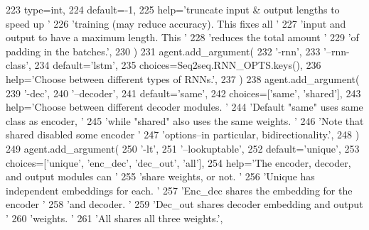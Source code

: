 \begin{DoxyCode}
223             type=int,
224             default=-1,
225             help=\textcolor{stringliteral}{'truncate input & output lengths to speed up '}
226             \textcolor{stringliteral}{'training (may reduce accuracy). This fixes all '}
227             \textcolor{stringliteral}{'input and output to have a maximum length. This '}
228             \textcolor{stringliteral}{'reduces the total amount '}
229             \textcolor{stringliteral}{'of padding in the batches.'},
230         )
231         agent.add\_argument(
232             \textcolor{stringliteral}{'-rnn'},
233             \textcolor{stringliteral}{'--rnn-class'},
234             default=\textcolor{stringliteral}{'lstm'},
235             choices=Seq2seq.RNN\_OPTS.keys(),
236             help=\textcolor{stringliteral}{'Choose between different types of RNNs.'},
237         )
238         agent.add\_argument(
239             \textcolor{stringliteral}{'-dec'},
240             \textcolor{stringliteral}{'--decoder'},
241             default=\textcolor{stringliteral}{'same'},
242             choices=[\textcolor{stringliteral}{'same'}, \textcolor{stringliteral}{'shared'}],
243             help=\textcolor{stringliteral}{'Choose between different decoder modules. '}
244             \textcolor{stringliteral}{'Default "same" uses same class as encoder, '}
245             \textcolor{stringliteral}{'while "shared" also uses the same weights. '}
246             \textcolor{stringliteral}{'Note that shared disabled some encoder '}
247             \textcolor{stringliteral}{'options--in particular, bidirectionality.'},
248         )
249         agent.add\_argument(
250             \textcolor{stringliteral}{'-lt'},
251             \textcolor{stringliteral}{'--lookuptable'},
252             default=\textcolor{stringliteral}{'unique'},
253             choices=[\textcolor{stringliteral}{'unique'}, \textcolor{stringliteral}{'enc\_dec'}, \textcolor{stringliteral}{'dec\_out'}, \textcolor{stringliteral}{'all'}],
254             help=\textcolor{stringliteral}{'The encoder, decoder, and output modules can '}
255             \textcolor{stringliteral}{'share weights, or not. '}
256             \textcolor{stringliteral}{'Unique has independent embeddings for each. '}
257             \textcolor{stringliteral}{'Enc\_dec shares the embedding for the encoder '}
258             \textcolor{stringliteral}{'and decoder. '}
259             \textcolor{stringliteral}{'Dec\_out shares decoder embedding and output '}
260             \textcolor{stringliteral}{'weights. '}
261             \textcolor{stringliteral}{'All shares all three weights.'},

\end{DoxyCode}
